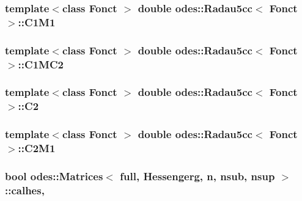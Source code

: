 \subsubsection[{C1\+M1}]{\setlength{\rightskip}{0pt plus 5cm}template$<$class Fonct $>$ double {\bf odes\+::\+Radau5cc}$<$ Fonct $>$\+::C1\+M1\hspace{0.3cm}{\ttfamily [private]}}\label{classodes_1_1Radau5cc_a1cf578a3f19e8e43321e182c46f710f4}
\hypertarget{classodes_1_1Radau5cc_a9d7ed1a3ffb2f3c582e1790e65f24671}{}
\subsubsection[{C1\+M\+C2}]{\setlength{\rightskip}{0pt plus 5cm}template$<$class Fonct $>$ double {\bf odes\+::\+Radau5cc}$<$ Fonct $>$\+::C1\+M\+C2\hspace{0.3cm}{\ttfamily [private]}}\label{classodes_1_1Radau5cc_a9d7ed1a3ffb2f3c582e1790e65f24671}
\hypertarget{classodes_1_1Radau5cc_a4c4e52ad2bb85b6e3a598b75aecbdad8}{}
\subsubsection[{C2}]{\setlength{\rightskip}{0pt plus 5cm}template$<$class Fonct $>$ double {\bf odes\+::\+Radau5cc}$<$ Fonct $>$\+::C2\hspace{0.3cm}{\ttfamily [private]}}\label{classodes_1_1Radau5cc_a4c4e52ad2bb85b6e3a598b75aecbdad8}
\hypertarget{classodes_1_1Radau5cc_ab2b14b1062b5fb6dde7557fbac202c29}{}
\subsubsection[{C2\+M1}]{\setlength{\rightskip}{0pt plus 5cm}template$<$class Fonct $>$ double {\bf odes\+::\+Radau5cc}$<$ Fonct $>$\+::C2\+M1\hspace{0.3cm}{\ttfamily [private]}}\label{classodes_1_1Radau5cc_ab2b14b1062b5fb6dde7557fbac202c29}
\hypertarget{classodes_1_1Matrices_a82e935680c27f58bcff8a559700411c6}{}
\subsubsection[{calhes}]{\setlength{\rightskip}{0pt plus 5cm}bool {\bf odes\+::\+Matrices}$<$ full, Hessengerg, {\bf n}, nsub, {\bf nsup} $>$\+::calhes\hspace{0.3cm}{\ttfamily [protected]}, {\ttfamily [inherited]}}\label{classodes_1_1Matrices_a82e935680c27f58bcff8a559700411c6}
\hypertarget{classodes_1_1Radau5cc_a774b282697116ae2f25f6d2fdce9410c}{}
